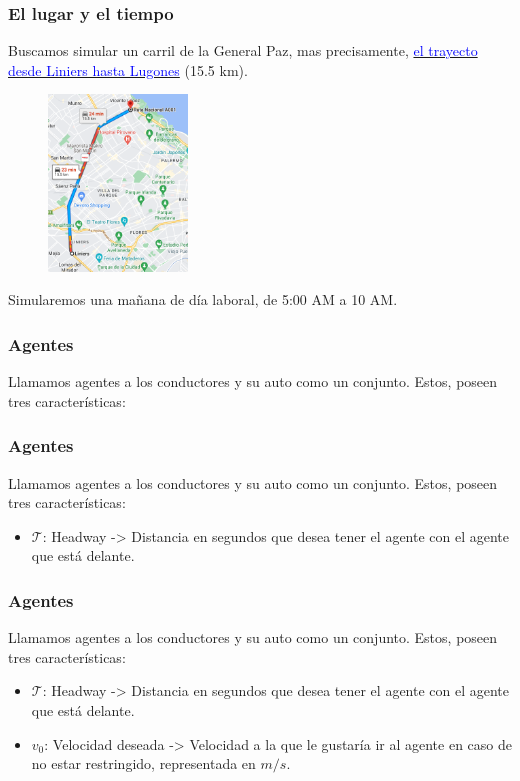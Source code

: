 \documentclass[10pt, compress]{beamer}
\begin{document}
\begin{frame}[fragile]

\frametitle{El lugar y el tiempo}
Buscamos simular un carril de la General Paz, mas precisamente, \href{https://www.google.com.ar/maps/dir/-34.6549026,-58.5273448/RN+A001,+Buenos+Aires/@-34.5529941,-58.5215513,13z/data=!4m9!4m8!1m0!1m5!1m1!1s0x95bcb6a69ad1fc61:0x7f1d6a8008451498!2m2!1d-58.4682776!2d-34.5357282!3e0?entry=ttu}{\textcolor{blue}{el trayecto desde Liniers hasta Lugones}} (15.5 km). 

\begin{figure}
\centering
\includegraphics[width=10em]{gmaps-recorrido}
\end{figure}

Simularemos una ma\~nana de d\'ia laboral, de 5:00 AM a 10 AM.
\addtocounter{framenumber}{-1}
\end{frame}

\begin{frame}[fragile]

\frametitle{Agentes}

Llamamos agentes a los conductores y su auto como un conjunto. Estos, poseen tres caracter\'isticas:

\end{frame}

\begin{frame}[fragile]

\frametitle{Agentes}

Llamamos agentes a los conductores y su auto como un conjunto. Estos, poseen tres caracter\'isticas:

\begin{itemize}
\item $\mathcal{T}$: Headway -> Distancia en segundos que desea tener el agente con el agente que est\'a delante.
\end{itemize}
\addtocounter{framenumber}{-1}
\end{frame}
\begin{frame}[fragile]

\frametitle{Agentes}

Llamamos agentes a los conductores y su auto como un conjunto. Estos, poseen tres caracter\'isticas:

\begin{itemize}
\item $\mathcal{T}$: Headway -> Distancia en segundos que desea tener el agente con el agente que est\'a delante.
\item $v_0$: Velocidad deseada -> Velocidad a la que le gustar\'ia ir al agente en caso de no estar restringido, representada en $m/s$.
\end{itemize}
\addtocounter{framenumber}{-1}
\end{frame}
\end{document}
